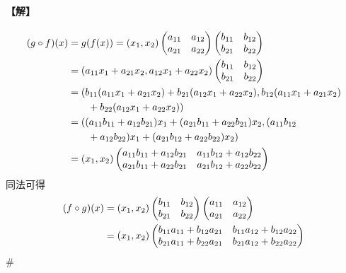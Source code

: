 \paragraph{【解】}
\begin{align}
(g \circ f)(x) &= g(f(x)) = (x_1, x_2) \begin{pmatrix} a_{11} & a_{12} \\ a_{21} & a_{22} \end{pmatrix} \begin{pmatrix} b_{11} & b_{12} \\ b_{21} & b_{22} \end{pmatrix} \notag \\
&= (a_{11}x_1 + a_{21}x_2, a_{12}x_1 + a_{22}x_2) \begin{pmatrix} b_{11} & b_{12} \\ b_{21} & b_{22} \end{pmatrix} \notag \\
&= (b_{11}(a_{11}x_1 + a_{21}x_2) + b_{21}(a_{12}x_1 + a_{22}x_2), b_{12}(a_{11}x_1 + a_{21}x_2) \notag \\
&\qquad + b_{22}(a_{12}x_1 + a_{22}x_2)) \label{eq:b6-1-7-1} \\
&= ((a_{11}b_{11} + a_{12}b_{21})x_1 + (a_{21}b_{11} + a_{22}b_{21})x_2, (a_{11}b_{12} \notag \\
&\qquad + a_{12}b_{22})x_1 + (a_{21}b_{12} + a_{22}b_{22})x_2) \label{eq:b6-1-7-2} \\
&= (x_1, x_2) \begin{pmatrix}
a_{11}b_{11} + a_{12}b_{21} & a_{11}b_{12} + a_{12}b_{22} \\
a_{21}b_{11} + a_{22}b_{21} & a_{21}b_{12} + a_{22}b_{22}
\end{pmatrix} \label{eq:b6-1-7-3}
\end{align}
同法可得
\begin{align}
(f \circ g)(x) &= (x_1, x_2) \begin{pmatrix} b_{11} & b_{12} \\ b_{21} & b_{22} \end{pmatrix} \begin{pmatrix} a_{11} & a_{12} \\ a_{21} & a_{22} \end{pmatrix} \notag \\
&= (x_1, x_2) \begin{pmatrix}
b_{11}a_{11} + b_{12}a_{21} & b_{11}a_{12} + b_{12}a_{22} \\
b_{21}a_{11} + b_{22}a_{21} & b_{21}a_{12} + b_{22}a_{22}
\end{pmatrix} \label{eq:b6-1-7-4}
\end{align}
\hfill$\#$

